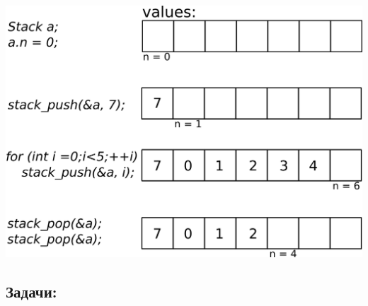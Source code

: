 \documentclass{article}
\begin{document}
\begin{center}
\includegraphics[width=0.6\linewidth]{../images/stack.png}
\end{center}

\subsection*{Задачи:}
\end{document}
